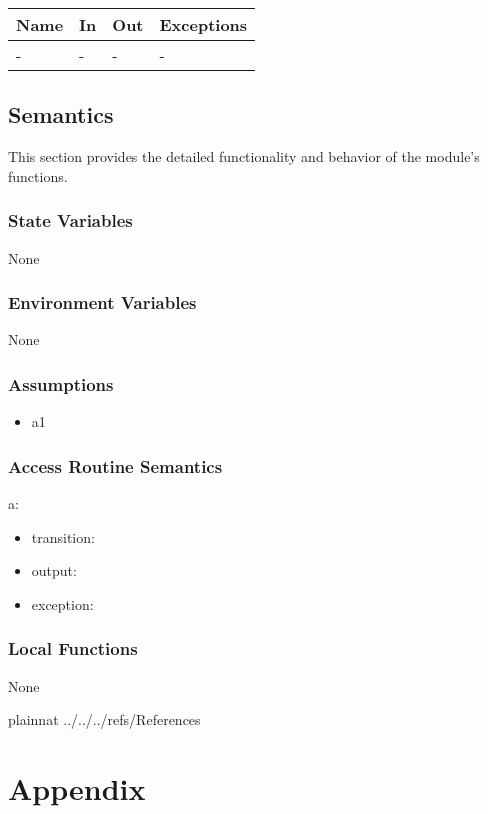 \documentclass[12pt, titlepage]{article}
\begin{document}
\begin{center}
\begin{tabular}{p{2cm} p{4cm} p{4cm} p{2cm}}
\hline
\textbf{Name} & \textbf{In} & \textbf{Out} & \textbf{Exceptions} \\
\hline
- & - & - & - \\
\hline
\end{tabular}
\end{center}

\subsection{Semantics}

This section provides the detailed functionality and behavior of the module’s
functions.

\subsubsection{State Variables}

None

\subsubsection{Environment Variables}

None

\subsubsection{Assumptions}

\begin{itemize}
\item a1
\end{itemize}

\subsubsection{Access Routine Semantics}

\noindent a:
\begin{itemize}
\item transition: 
\item output: 
\item exception: 
\end{itemize}

\subsubsection{Local Functions}

None

\newpage

 {plainnat}
 {../../../refs/References}

\newpage

\section{Appendix} \label{Appendix}

\end{document}
